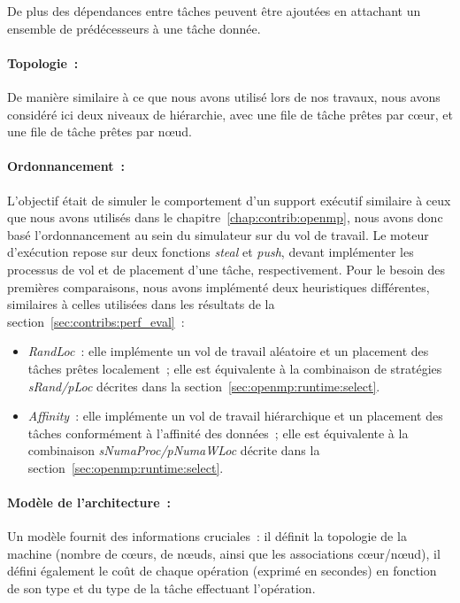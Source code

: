 De plus des dépendances entre tâches peuvent être ajoutées en attachant un ensemble de prédécesseurs à une tâche donnée.

\paragraph{Topologie~:}
De manière similaire à ce que nous avons utilisé lors de nos travaux, nous avons considéré ici deux niveaux de hiérarchie, avec une file de tâche prêtes par cœur, et une file de tâche prêtes par nœud.

\paragraph{Ordonnancement~:}
L'objectif était de simuler le comportement d'un support exécutif similaire à ceux que nous avons utilisés dans le chapitre~\ref{chap:contrib:openmp}, nous avons donc basé l'ordonnancement au sein du simulateur sur du vol de travail.
Le moteur d'exécution repose sur deux fonctions \emph{steal} et \emph{push}, devant implémenter les processus de vol et de placement d'une tâche, respectivement.
Pour le besoin des premières comparaisons, nous avons implémenté deux heuristiques différentes, similaires à celles utilisées dans les résultats de la section~\ref{sec:contribs:perf_eval}~:
\begin{itemize}
  \item \emph{RandLoc}~: elle implémente un vol de travail aléatoire et un placement des tâches prêtes localement~; elle est équivalente à la combinaison de stratégies \emph{sRand/pLoc} décrites dans la section~\ref{sec:openmp:runtime:select}.
  \item \emph{Affinity}~: elle implémente un vol de travail hiérarchique et un placement des tâches conformément à l'affinité des données~; elle est équivalente à la combinaison \emph{sNumaProc/pNumaWLoc} décrite dans la section~\ref{sec:openmp:runtime:select}.
\end{itemize}


\paragraph{Modèle de l'architecture~:}

Un modèle fournit des informations cruciales~: il définit la topologie de la machine (nombre de cœurs, de nœuds, ainsi que les associations cœur/nœud), il défini également le coût de chaque opération (exprimé en secondes) en fonction de son type et du type de la tâche effectuant l'opération.

